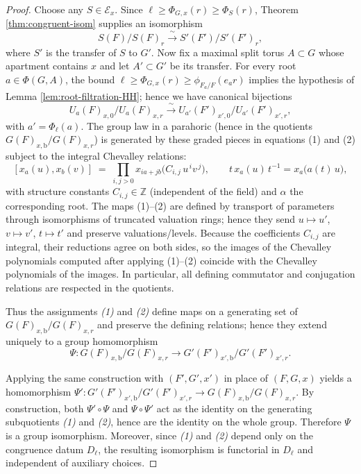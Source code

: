 \documentclass[american]{article}
\numberwithin{equation}{section}
\numberwithin{figure}{section}
\theoremstyle{plain}
\theoremstyle{definition}
\theoremstyle{remark}
\begin{document}
\begin{proof}
Choose any $S\in\mathscr{E}_x$. Since $\ell\ge\Phi_{G,x}(r)\ge\Phi_S(r)$, Theorem \ref{thm:congruent-isom} supplies an isomorphism
\[
  S(F)/S(F)_r \xrightarrow{\;\sim\;} S'(F')/S'(F')_r,
\tag{1}
\]
where $S'$ is the transfer of $S$ to $G'$.
Now fix a maximal split torus $A\subset G$ whose apartment contains $x$ and let $A'\subset G'$ be its transfer. For every root $a\in\Phi(G,A)$, the bound $\ell\ge\Phi_{G,x}(r)\ge\phi_{F_a/F}(e_a r)$ implies the hypothesis of Lemma \ref{lem:root-filtration-HH}; hence we have canonical bijections
\[
  U_a(F)_{x,0}/U_a(F)_{x,r} \xrightarrow{\;\sim\;} U_{a'}(F')_{x',0}/U_{a'}(F')_{x',r},
\tag{2}
\]
with $a'=\Phi_\ell(a)$.
The group law in a parahoric (hence in the quotients $G(F)_{x,\mathrm{b}}/G(F)_{x,r}$)
is generated by these graded pieces in equations (1) and (2) subject to the integral
Chevalley relations:
\[
[x_a(u),x_b(v)]
 \;=\; \prod_{i,j>0} x_{i a + j b}\!\big(C_{i,j}\,u^{\,i}v^{\,j}\big),
\qquad
t\,x_a(u)\,t^{-1}=x_a\!\big(a(t)\,u\big),
\]
with structure constants $C_{i,j}\in\mathbb{Z}$ (independent of the field) and
$\alpha$ the corresponding root.  The maps (1)--(2) are defined by
transport of parameters through isomorphisms of truncated valuation rings;
hence they send $u\mapsto u'$, $v\mapsto v'$, $t\mapsto t'$ and preserve
valuations/levels. Because the coefficients $C_{i,j}$ are integral, their
reductions agree on both sides, so the images of the Chevalley polynomials
computed after applying (1)--(2) coincide with the Chevalley polynomials of
the images. In particular, all defining commutator and conjugation relations
are respected in the quotients.

Thus the assignments \emph{(1)} and \emph{(2)} define maps on a generating set of
$G(F)_{x,\mathrm{b}}/G(F)_{x,r}$ and preserve the defining relations; hence they extend uniquely
to a group homomorphism
\[
  \Psi \colon G(F)_{x,\mathrm{b}}/G(F)_{x,r}\longrightarrow G'(F')_{x',\mathrm{b}}/G'(F')_{x',r}.
\]

Applying the same construction with $(F',G',x')$ in place of $(F,G,x)$ yields a
homomorphism $\Psi' \colon G'(F')_{x',\mathrm{b}}/G'(F')_{x',r}\to G(F)_{x,\mathrm{b}}/G(F)_{x,r}$.
By construction, both $\Psi'\circ\Psi$ and $\Psi\circ\Psi'$ act as the identity on
the generating subquotients \emph{(1)} and \emph{(2)}, hence are the identity on the
whole group. Therefore $\Psi$ is a group isomorphism. Moreover, since \emph{(1)} and
\emph{(2)} depend only on the congruence datum $D_\ell$, the resulting isomorphism is
functorial in $D_\ell$ and independent of auxiliary choices.


\end{proof}
\end{document}

